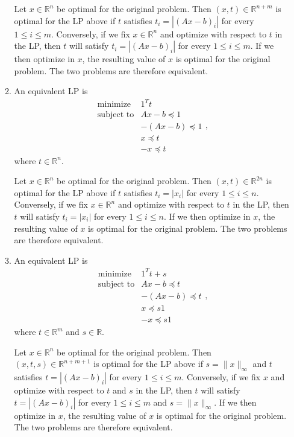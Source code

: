 \documentclass[letterpaper,12pt]{article}
\begin{document}
\begin{enumerate}
\begin{enumerate}
  Let $x \in \mathbb{R}^n$ be optimal for the original problem. Then
  $(x, t) \in \mathbb{R}^{n+m}$ is optimal for the LP above if $t$
  satisfies $t_i = |(Ax - b)_i|$ for every $1 \leq i \leq
  m$. Conversely, if we fix $x \in \mathbb{R}^n$ and optimize with
  respect to $t$ in the LP, then $t$ will satisfy $t_i = |(Ax - b)_i|$
  for every $1 \leq i \leq m$. If we then optimize in $x$, the
  resulting value of $x$ is optimal for the original problem. The two
  problems are therefore equivalent.

\item An equivalent LP is
  \begin{equation*}
    \begin{array}{ll}
      \text{minimize} & 1^T t \\
      \text{subject to}
        & Ax - b \preceq 1 \\
        &-(Ax - b) \preceq 1 \\
        &x \preceq t \\
        &-x \preceq t
    \end{array},
  \end{equation*}
  where $t \in \mathbb{R}^n$.

  Let $x \in \mathbb{R}^n$ be optimal for the original problem. Then
  $(x, t) \in \mathbb{R}^{2n}$ is optimal for the LP above if $t$
  satisfies $t_i = |x_i|$ for every $1 \leq i \leq n$. Conversely, if
  we fix $x \in \mathbb{R}^n$ and optimize with respect to $t$ in the
  LP, then $t$ will satisfy $t_i = |x_i|$ for every $1 \leq i \leq
  n$. If we then optimize in $x$, the resulting value of $x$ is
  optimal for the original problem. The two problems are therefore
  equivalent.

\item An equivalent LP is
  \begin{equation*}
    \begin{array}{ll}
      \text{minimize} & 1^T t + s \\
      \text{subject to}
        & Ax - b \preceq t \\
        &-(Ax - b) \preceq t \\
        &x \preceq s1 \\
        &-x \preceq s1
    \end{array},
  \end{equation*}
  where $t \in \mathbb{R}^m$ and $s \in \mathbb{R}$.

  Let $x \in \mathbb{R}^n$ be optimal for the original problem. Then
  $(x, t, s) \in \mathbb{R}^{n+m+1}$ is optimal for the LP above if
  $s = \lVert x \rVert_\infty$ and $t$ satisfies $t = |(Ax - b)_i|$
  for every $1 \leq i \leq m$. Conversely, if we fix $x$ and optimize
  with respect to $t$ and $s$ in the LP, then $t$ will satisfy
  $t = |(Ax - b)_i|$ for every $1 \leq i \leq m$ and
  $s = \lVert x \rVert_\infty$. If we then optimize in $x$, the
  resulting value of $x$ is optimal for the original problem. The two
  problems are therefore equivalent.


\end{enumerate}
\end{enumerate}
\end{document}
